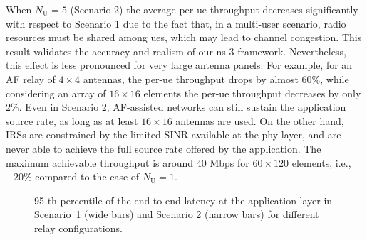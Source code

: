 When $N_{\mathrm U}=5$ (Scenario 2) the average per-\gls{ue} throughput decreases significantly with respect to Scenario 1 due to the fact that, in a multi-user scenario, radio resources must be shared among \glspl{ue}, which may lead to channel congestion. This result validates the accuracy and realism of our ns-3 framework.
 Nevertheless, this effect is less pronounced for very large antenna panels. For example, for an AF relay of $4\times4$ antennas, the per-\gls{ue} throughput drops by almost $60\%$, while considering an array of $16\times16$ elements the per-\gls{ue} throughput decreases by only $2\%$.
Even in Scenario 2, AF-assisted networks can still sustain the application source rate, as long as at least $16\times16$ antennas are used.
On the other hand, IRSs are constrained by the limited SINR available at the \gls{phy} layer, and are never able to achieve the full source rate offered by the application. The maximum achievable throughput is around $40$ Mbps for $60\times120$ elements, i.e., $-20$\% compared to the case of $N_{\mathrm U}=1$.





\begin{figure}[t!]
	\centering
	\setlength{}
	\setlength{}
	
	\caption{95-th percentile of the end-to-end latency at the application layer in Scenario~1 (wide bars) and Scenario 2 (narrow bars) for different relay configurations.}
	\label{fig:latency}
\end{figure}


